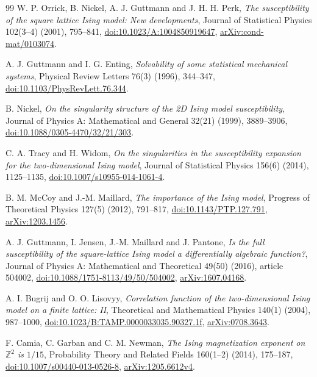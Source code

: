 \documentclass[11pt]{article}
\numberwithin{equation}{section}
\theoremstyle{definition}
\begin{document}
\begin{thebibliography}{99}
W. P. Orrick, B. Nickel, A. J. Guttmann and J. H. H. Perk,
\emph{The susceptibility of the square lattice Ising model: New developments},
Journal of Statistical Physics 102(3--4) (2001), 795--841,
\href{https://doi.org/10.1023/A:1004850919647}{doi:10.1023/A:1004850919647},
\href{https://arxiv.org/abs/cond-mat/0103074}{arXiv:cond-mat/0103074}.

A. J. Guttmann and I. G. Enting,
\emph{Solvability of some statistical mechanical systems},
Physical Review Letters 76(3) (1996), 344--347,
\href{https://doi.org/10.1103/PhysRevLett.76.344}{doi:10.1103/PhysRevLett.76.344}.

B. Nickel, \emph{On the singularity structure of the 2D Ising model
susceptibility}, Journal of Physics A: Mathematical and General 32(21)
(1999), 3889--3906,
\href{https://doi.org/10.1088/0305-4470/32/21/303}{doi:10.1088/0305-4470/32/21/303}.

C. A. Tracy and H. Widom,
\emph{On the singularities in the susceptibility expansion for the
two-dimensional Ising model}, Journal of Statistical Physics 156(6)
(2014), 1125--1135,
\href{https://doi.org/10.1007/s10955-014-1061-4}{doi:10.1007/s10955-014-1061-4}.

B. M. McCoy and J.-M. Maillard,
\emph{The importance of the Ising model},
Progress of Theoretical Physics 127(5) (2012), 791--817,
\href{https://doi.org/10.1143/PTP.127.791}{doi:10.1143/PTP.127.791},
\href{https://arxiv.org/abs/1203.1456}{arXiv:1203.1456}.

A. J. Guttmann, I. Jensen, J.-M. Maillard and J. Pantone,
\emph{Is the full susceptibility of the square-lattice Ising model a
differentially algebraic function?},
Journal of Physics A: Mathematical and Theoretical 49(50) (2016), article 504002,
\href{https://doi.org/10.1088/1751-8113/49/50/504002}{doi:10.1088/1751-8113/49/50/504002},
\href{https://arxiv.org/abs/1607.04168}{arXiv:1607.04168}.

A. I. Bugrij and O. O. Lisovyy,
\emph{Correlation function of the two-dimensional Ising model on a finite
lattice: II}, Theoretical and Mathematical Physics 140(1)
(2004), 987--1000,
\href{https://doi.org/10.1023/B:TAMP.0000033035.90327.1f}{doi:10.1023/B:TAMP.0000033035.90327.1f},
\href{https://arxiv.org/abs/0708.3643}{arXiv:0708.3643}.



F. Camia, C. Garban and C. M. Newman,
\emph{The Ising magnetization exponent on $\mathbb Z^2$ is $1/15$},
Probability Theory and Related Fields 160(1--2) (2014), 175--187,
\href{https://doi.org/10.1007/s00440-013-0526-8}{doi:10.1007/s00440-013-0526-8},
\href{https://arxiv.org/abs/1205.6612v4}{arXiv:1205.6612v4}.


\end{thebibliography}
\end{document}
